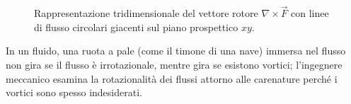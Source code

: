 \documentclass[main.tex]{subfiles}
\begin{document}
\begin{figure}[htbp]
	\caption{Rappresentazione tridimensionale del vettore rotore $\nabla \times \vec{F}$ con linee di flusso circolari giacenti sul piano prospettico $xy$.}
	\label{fig:pre:rotore_3d_prospettiva_reale}
\end{figure}

In un fluido, una ruota a pale (come il timone di una nave) immersa nel flusso non gira se il flusso è irrotazionale, mentre gira se esistono vortici; l'ingegnere meccanico esamina la rotazionalità dei flussi attorno alle carenature perché i vortici sono spesso indesiderati.
\end{document}
